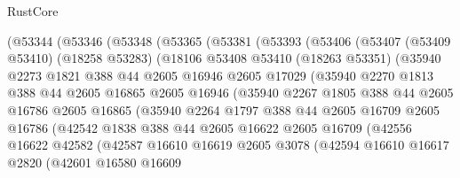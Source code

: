 \begin{lexlean}{RustCore}
\begin{coremodule}
      (@53344
        (@53346
          (@53348
            (@53365
              (@53381
                (@53393
                  (@53406
                    (@53407
                      (@53409 @53410)
                      (@18258 @53283)
                      (@18106
                        @53408
                        @53410
                        (@18263 @53351)
                        (@35940
                          @2273
                          @1821
                          @388
                          @44
                          @2605
                          @16946
                          @2605
                          @17029
                          (@35940
                            @2270
                            @1813
                            @388
                            @44
                            @2605
                            @16865
                            @2605
                            @16946
                            (@35940
                              @2267
                              @1805
                              @388
                              @44
                              @2605
                              @16786
                              @2605
                              @16865
                              (@35940
                                @2264
                                @1797
                                @388
                                @44
                                @2605
                                @16709
                                @2605
                                @16786
                                (@42542
                                  @1838
                                  @388
                                  @44
                                  @2605
                                  @16622
                                  @2605
                                  @16709
                                  (@42556
                                    @16622
                                    @42582
                                    (@42587
                                      @16610
                                      @16619
                                      @2605
                                      @3078
                                      (@42594
                                        @16610
                                        @16617
                                        @2820
                                        (@42601
                                          @16580
                                          @16609

\end{coremodule}
\end{lexlean}
